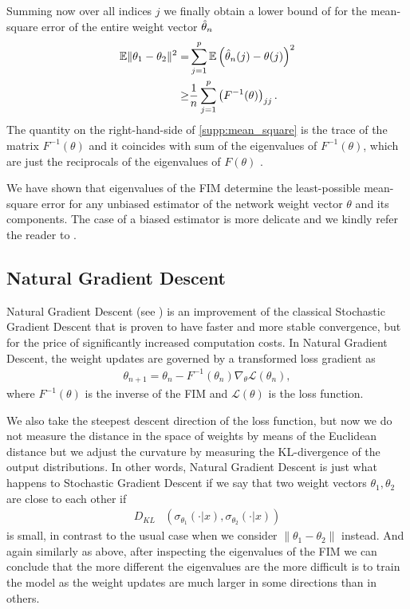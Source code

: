 Summing now over all indices $j$ we finally obtain a lower bound of for the mean-square error of the entire weight vector $\Hat{\theta}_n$
\begin{align}
    \mathbb{E}\|\theta_1-\theta_2\|^2=&\sum_{j=1}^p\mathbb{E}\left( \Hat{\theta}_n(j)-\theta(j)\right)^2\nonumber\\
    \geq&\frac{1}{n}\sum_{j=1}^p\left(F^{-1}(\theta)\right)_{jj}.
    \label{supp:mean_square}
\end{align}
The quantity on the right-hand-side of \eqref{supp:mean_square} is the trace of the matrix $F^{-1}(\theta)$ and it coincides with sum of the eigenvalues of $F^{-1}(\theta)$, which are just the reciprocals of the eigenvalues of $F(\theta)$ \cite{leon2006linear}. 

We have shown that eigenvalues of the FIM determine the least-possible mean-square error for any unbiased estimator of the network weight vector $\theta$ and its components. The case of a biased estimator is more delicate and we kindly refer the reader to \cite{frieden2010exploratory}.

\subsection{Natural Gradient Descent}
\label{subsec:ngd}
Natural Gradient Descent (see \cite{martens2020new}) is an improvement of the classical Stochastic Gradient Descent that is proven to have faster and more stable convergence, but for the price of significantly increased computation costs. In Natural Gradient Descent, the weight updates are governed by a transformed loss gradient as
\begin{align}
    \theta_{n+1}=\theta_n-F^{-1}(\theta_n)\nabla_\theta \mathcal{L}(\theta_n),
\end{align}
where $F^{-1}(\theta)$ is the inverse of the FIM and $\mathcal{L}(\theta)$ is the loss function. 

We also take the steepest descent direction of the loss function, but now we do not measure the distance in the space of weights by means of the Euclidean distance but we adjust the curvature by measuring the KL-divergence of the output distributions. In other words, Natural Gradient Descent is just what happens to Stochastic Gradient Descent if we say that two weight vectors $\theta_1, \theta_2$ are close to each other if
\begin{align}
    D_{KL}&(\sigma_{\theta_1}(\cdot|x), \sigma_{\theta_2}(\cdot|x))
\end{align}
is small, in contrast to the usual case when we consider $\|\theta_1-\theta_2\|$ instead.  And again similarly as above, after inspecting the eigenvalues of the FIM we can conclude that the more different the eigenvalues are the more difficult is to train the model as the weight updates are much larger in some directions than in others. 

